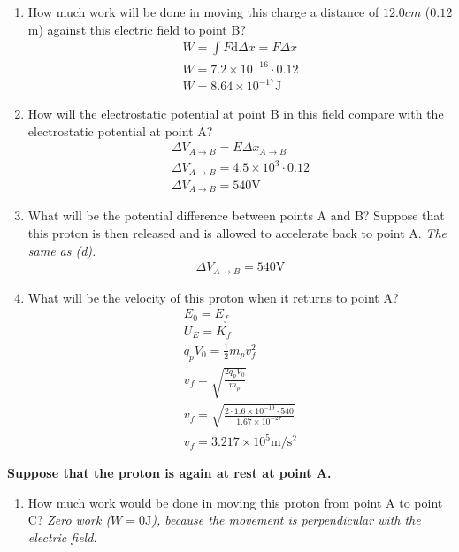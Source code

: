 \documentclass[12pt]{article}
\newcommand{\dd}[1]{\mathrm{d}#1}
\begin{document}
\begin{enumerate}
\begin{enumerate}
  \item How much work will be done in moving this charge a distance of $12.0cm$ ($0.12$ m) against this electric field to point B?
    \begin{align}
      W = \int F \dd \Delta x = F \Delta x \\
      W = 7.2 \times 10^{-16} \cdot 0.12 \\
      W = 8.64 \times 10^{-17} \mathrm{J}
    \end{align}

  \item How will the electrostatic potential at point B in this field compare with the electrostatic potential at point A?
    \begin{align}
      \Delta V_{A \to B} = E \Delta x_{A \to B} \\
      \Delta V_{A \to B} = 4.5 \times 10^{3} \cdot 0.12\\
      \Delta V_{A \to B} = 540 \mathrm{V}
    \end{align}

  \item What will be the potential difference between points A and B? Suppose that this proton is then released and is allowed to accelerate back to point A.
    \textit{The same as (d).}
    \begin{align}
      \Delta V_{A \to B} = 540 \mathrm{V}
    \end{align}

  \item What will be the velocity of this proton when it returns to point A?
    \begin{align}
      E_{0} = E_{f} \\
      U_{E} = K_{f} \\
      q_{p}V_{0} = \frac{1}{2}m_{p}v_{f}^{2} \\
      v_{f} = \sqrt{\frac{2q_{p}V_{0}}{m_{p}}} \\
      v_{f} = \sqrt{\frac{2 \cdot 1.6 \times 10^{-19} \cdot 540}{1.67 \times 10^{-27}}} \\
      v_{f} = 3.217 \times 10^{5} \mathrm{m/s^2}
    \end{align}
\end{enumerate}

\textbf{Suppose that the proton is again at rest at point A.}

\begin{enumerate}[resume]
  \item How much work would be done in moving this proton from point A to point C?
    \textit{Zero work ($W = 0 \mathrm{J}$), because the movement is perpendicular with the electric field.}


\end{enumerate}
\end{enumerate}
\end{document}
